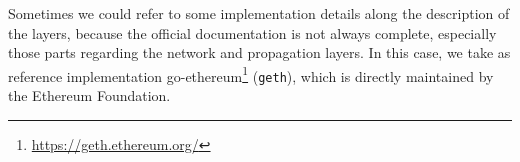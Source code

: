 Sometimes we could refer to some implementation details along the description of
the layers, because the official documentation is not always complete,
especially those parts regarding the network and propagation layers. In this
case, we take as reference implementation
go-ethereum\footnote{\url{https://geth.ethereum.org/}} (\texttt{geth}), which is
directly maintained by the Ethereum Foundation.











